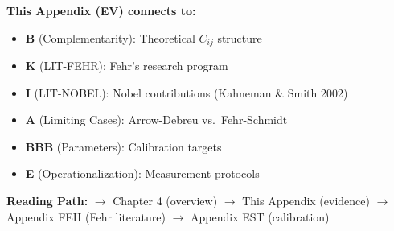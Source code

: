 \begin{tcolorbox}[colback=gray!10!white, colframe=gray!75!black,
    title=\textbf{Cross-Reference Footer}]
\label{sec:EV-footer}

\textbf{This Appendix (EV) connects to:}
\begin{itemize}[nosep]
    \item \textbf{B} (Complementarity): Theoretical $C_{ij}$ structure
    \item \textbf{K} (LIT-FEHR): Fehr's research program
    \item \textbf{I} (LIT-NOBEL): Nobel contributions (Kahneman \& Smith 2002)
    \item \textbf{A} (Limiting Cases): Arrow-Debreu vs.\ Fehr-Schmidt
    \item \textbf{BBB} (Parameters): Calibration targets
    \item \textbf{E} (Operationalization): Measurement protocols
\end{itemize}

\textbf{Reading Path:}
$\rightarrow$ Chapter 4 (overview) $\rightarrow$ This Appendix (evidence)
$\rightarrow$ Appendix FEH (Fehr literature) $\rightarrow$ Appendix EST (calibration)

\end{tcolorbox}

